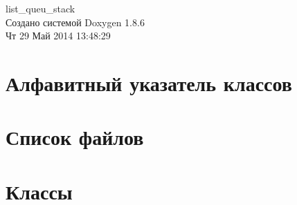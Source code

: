 \documentclass[twoside]{book}
\newcommand{\clearemptydoublepage}{%
  \newpage{\pagestyle{empty}\cleardoublepage}%
}
\begin{document}
\hypersetup{pageanchor=false}
\begin{titlepage}
\vspace*{7cm}
\begin{center}%
{\Large list\-\_\-queu\-\_\-stack }\\
\vspace*{1cm}
{\large Создано системой Doxygen 1.8.6}\\
\vspace*{0.5cm}
{\small Чт 29 Май 2014 13:48:29}\\
\end{center}
\end{titlepage}
\clearemptydoublepage
\tableofcontents
\clearemptydoublepage
{}
\hypersetup{pageanchor=true}

\chapter{Алфавитный указатель классов}

\chapter{Список файлов}

\chapter{Классы}

\end{document}
